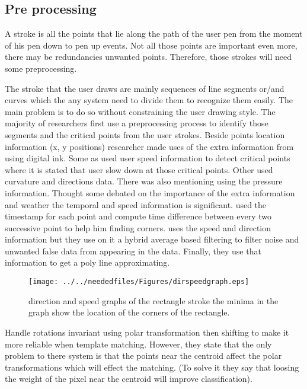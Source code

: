 \subsection{Pre processing }
\label {sec:preprocessing}
 A stroke is all the points that lie along the path of the user pen from the moment of his pen down to pen up events. Not all those points are important even more, there may be redundancies unwanted points. Therefore, those strokes will need some preprocessing.
 
The stroke that the user draws are mainly sequences of line segments or/and curves which the any system need to divide them to recognize them easily. The main problem is to do so without constraining the user drawing style. The majority of researchers first use a preprocessing process to identify those segments and the critical points from the user strokes.  
Beside points location information (x, y positions) researcher made uses of the extra information from using digital ink. Some as \cite {mulitstroke5,polygonfeedback31}  used user speed information to detect critical points where it is stated that user slow down at those critical points. Other used curvature and directions data. There was also mentioning using the pressure information.  Thought some \cite {MilitaryCOA37,computationalmodel16,polygonfeedback31}  debated on the importance of the extra information and weather the temporal and speed information is significant.  \cite{polygonfeedback31}  used the timestamp for each point and compute time difference between every two successive point to help him finding corners.
\cite{Overview36} uses the speed and direction information but they use on it a hybrid average based filtering to filter noise and unwanted false data from appearing in the data. Finally, they use that information to get a poly line approximating.
 
 
\begin{figure}
	\centering
		\texttt{[image: ../../neededfiles/Figures/dirspeedgraph.eps]}
	\caption[Direction and Speed]{direction and speed graphs of the rectangle stroke the minima in the graph show the location of the corners of the rectangle.}
	\label{fig:dirspeedgraph}
\end{figure}

\cite{Mathpad46}Handle rotations invariant using polar transformation then shifting to make it more reliable when template matching. However, they state that the only problem to there system is that the points near the centroid affect the polar transformations which will effect the matching. (To solve it they say that loosing the weight of the pixel near the centroid will improve classification).

